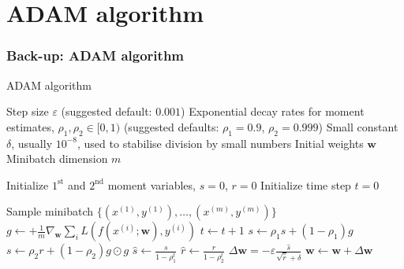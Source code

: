 \documentclass[xcolor=table,8pt]{beamer}
\begin{document}
    \section{ADAM algorithm}
    \begin{frame}[t]
        \frametitle{Back-up: ADAM algorithm}
    
        \begin{algorithm}[H]
            \caption{ADAM algorithm}\label{alg:theory_TTN_adam}
            \begin{algorithmic}[1]
                {\footnotesize
                \Require Step size \( \varepsilon \) (suggested default: \( 0.001 \))
                \Require Exponential decay rates for moment estimates, \( \rho_1, \rho_2 \in [0,1) \) (suggested defaults: \( \rho_{1}=0.9 \), \( \rho_2=0.999 \))
                \Require Small constant \( \delta \), usually \( 10^{-8} \), used to stabilise division by small numbers
                \Require Initial weights \( \boldsymbol{w} \)
                \Require Minibatch dimension \( m \)
                
                                                                         
                
                \State Initialize \( 1^\text{st} \) and \( 2^\text{nd} \) moment variables, \( s=0 \), \( r=0 \)
                \State Initialize time step \( t=0 \)
                
                \State Sample minibatch \( \{(x^{(1)},y^{(1)}), \dots, (x^{(m)},y^{(m)})\} \)%
                \State \( g \gets + \frac{1}{m} \nabla_{\boldsymbol{w}} \sum_{i} L(f(x^{(i)};\boldsymbol{w}), y^{(i)}) \) 
                \State \( t \gets t+1 \)
                \State \( s \gets \rho_1 s + (1-\rho_1) g \)                                                              
                \State \( s \gets \rho_2 r + (1-\rho_2) g \odot g \)                                                      
                \State \( \hat{s} \gets \frac{s}{1 - \rho^t_1} \)                                                         
                \State \( \hat{r} \gets \frac{r}{1 - \rho^t_2} \)                                                         
                \State \( \Delta \boldsymbol{w} = - \varepsilon \frac{\hat{s}}{\sqrt{\hat{r}} + \delta} \)                
                \State \( \boldsymbol{w} \gets \boldsymbol{w} + \Delta \boldsymbol{w} \)
                \EndWhile
                
}
\end{algorithmic}
\end{algorithm}
\end{frame}
\end{document}
